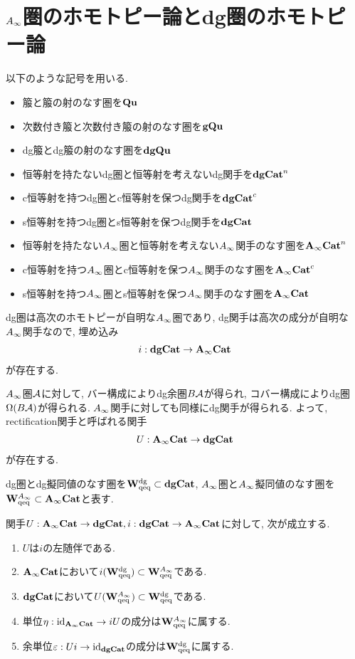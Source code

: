 \documentclass[uplatex, a4paper, 14Q, dvipdfmx]{jsarticle}
\begin{document}
\section{\texorpdfstring{$A_{\infty}$}{Ainf}圏のホモトピー論とdg圏のホモトピー論} \label{section_non_unital_Ainf_cat}

\begin{notation}
  以下のような記号を用いる.
  \begin{itemize}
    \item 箙と箙の射のなす圏を$\mathbf{Qu}$
    \item 次数付き箙と次数付き箙の射のなす圏を$\mathbf{gQu}$
    \item dg箙とdg箙の射のなす圏を$\mathbf{dgQu}$
    \item 恒等射を持たないdg圏と恒等射を考えないdg関手を$\mathbf{dgCat}^n$
    \item c恒等射を持つdg圏とc恒等射を保つdg関手を$\mathbf{dgCat}^c$
    \item s恒等射を持つdg圏とs恒等射を保つdg関手を$\mathbf{dgCat}$
    \item 恒等射を持たない$A_{\infty}$圏と恒等射を考えない$A_{\infty}$関手のなす圏を$\mathbf{A}_\infty\mathbf{Cat}^n$
    \item c恒等射を持つ$A_{\infty}$圏とc恒等射を保つ$A_{\infty}$関手のなす圏を$\mathbf{A}_\infty\mathbf{Cat}^c$
    \item s恒等射を持つ$A_{\infty}$圏とs恒等射を保つ$A_{\infty}$関手のなす圏を$\mathbf{A}_\infty\mathbf{Cat}$
  \end{itemize}
\end{notation}

dg圏は高次のホモトピーが自明な$A_{\infty}$圏であり, dg関手は高次の成分が自明な$A_{\infty}$関手なので, 埋め込み
\begin{align*}
  i : \mathbf{dgCat} \to \mathbf{A}_\infty\mathbf{Cat}
\end{align*}
が存在する. 

$A_{\infty}$圏$\mathcal{A}$に対して, バー構成によりdg余圏$B\mathcal{A}$が得られ, コバー構成によりdg圏$\Omega(B\mathcal{A})$が得られる. 
$A_{\infty}$関手に対しても同様にdg関手が得られる. 
よって, rectification関手と呼ばれる関手
\begin{align*}
  U : \mathbf{A}_\infty\mathbf{Cat} \to \mathbf{dgCat}
\end{align*}
が存在する.

\begin{notation}
  dg圏とdg擬同値のなす圏を$\mathbf{W}^{\mathrm{dg}}_\mathrm{qeq} \subset \mathbf{dgCat}$, $A_{\infty}$圏と$A_{\infty}$擬同値のなす圏を$\mathbf{W}^{A_{\infty}}_\mathrm{qeq} \subset \mathbf{A}_\infty\mathbf{Cat}$と表す.   
\end{notation}

\begin{theorem} \label{prop_U_and_i_are_adjoint}
  関手$U : \mathbf{A}_\infty\mathbf{Cat} \to \mathbf{dgCat}, i : \mathbf{dgCat} \to \mathbf{A}_\infty\mathbf{Cat}$に対して, 次が成立する.
  \begin{enumerate}
    \item $U$は$i$の左随伴である.
    \item $\mathbf{A}_\infty\mathbf{Cat}$において$i(\mathbf{W}^{\mathrm{dg}}_\mathrm{qeq}) \subset \mathbf{W}^{A_{\infty}}_\mathrm{qeq}$である. 
    \item $\mathbf{dgCat}$において$U(\mathbf{W}^{A_{\infty}}_\mathrm{qeq}) \subset \mathbf{W}^{\mathrm{dg}}_\mathrm{qeq}$である. 
    \item 単位$\eta : \mathrm{id}_{\mathbf{A}_\infty\mathbf{Cat}} \to iU$の成分は$\mathbf{W}^{A_{\infty}}_\mathrm{qeq}$に属する.
    \item 余単位$\varepsilon : Ui \to \mathrm{id}_{\mathbf{dgCat}}$の成分は$\mathbf{W}^{\mathrm{dg}}_\mathrm{qeq}$に属する. 
  \end{enumerate}
\end{theorem}
\end{document}
